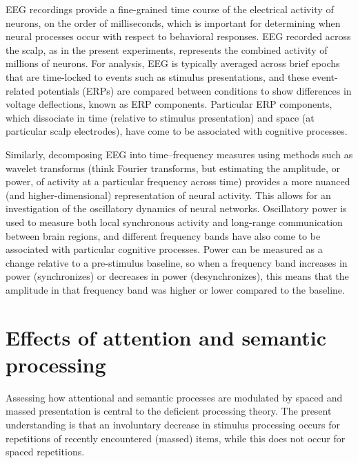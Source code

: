 EEG recordings provide a fine-grained time course of the electrical
activity of neurons, on the order of milliseconds, which is important
for determining when neural processes occur with respect to behavioral
responses.  EEG recorded across the scalp, as in the present experiments, represents the combined activity of millions of neurons.  For analysis, EEG is typically averaged across brief
epochs that are time-locked to events such as stimulus presentations,
and these event-related potentials (ERPs) are compared between
conditions to show differences in voltage deflections, known as ERP
components.  Particular ERP components, which dissociate in time
(relative to stimulus presentation) and space (at particular scalp
electrodes), have come to be associated with cognitive processes.

Similarly, decomposing EEG into time--frequency measures using methods such as wavelet transforms
(think Fourier transforms, but estimating the amplitude, or power, of
activity at a particular frequency across time) provides a more
nuanced (and higher-dimensional) representation of neural activity.
This allows for an investigation of the oscillatory dynamics of neural
networks.  Oscillatory power is used to measure both local synchronous
activity and long-range communication between brain regions, and
different frequency bands have also come to be associated with particular
cognitive processes.  Power can be measured as a change relative to a pre-stimulus baseline, so when a frequency band increases in power (synchronizes) or decreases in power (desynchronizes), this means that the amplitude in that frequency band was higher or lower compared to the baseline.


\section{Effects of attention and semantic processing}


Assessing how attentional and semantic processes are modulated by spaced and massed presentation is central to the deficient processing theory.
The present understanding is that an involuntary decrease in stimulus processing occurs for repetitions of recently encountered (massed) items, while this does not occur for spaced repetitions.

